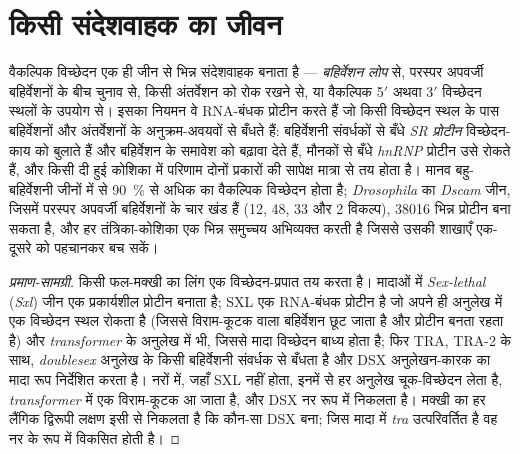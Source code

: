 \section{किसी संदेशवाहक का जीवन}

\begin{definition}[नियमित विच्छेदन]\label{def:b3:rna-regulation:splicing}
वैकल्पिक विच्छेदन एक ही जीन से भिन्न संदेशवाहक बनाता है ---
\emph{बहिर्वेशन लोप} से, परस्पर अपवर्जी बहिर्वेशनों के बीच चुनाव से,
किसी अंतर्वेशन को रोक रखने से, या वैकल्पिक 5$'$ अथवा 3$'$ विच्छेदन
स्थलों के उपयोग से। इसका नियमन वे RNA-बंधक प्रोटीन करते हैं जो किसी
विच्छेदन स्थल के पास बहिर्वेशनों और अंतर्वेशनों के अनुक्रम-अवयवों से
बँधते हैं: बहिर्वेशनी संवर्धकों से बँधे \emph{SR प्रोटीन}
विच्छेदन-काय को बुलाते हैं और बहिर्वेशन के समावेश को बढ़ावा देते हैं,
मौनकों से बँधे \emph{hnRNP} प्रोटीन उसे रोकते हैं, और किसी दी हुई
कोशिका में परिणाम दोनों प्रकारों की सापेक्ष मात्रा से तय होता है। मानव
बहु-बहिर्वेशनी जीनों में से \qty{90}{\%} से अधिक का वैकल्पिक विच्छेदन
होता है; \emph{Drosophila} का \emph{Dscam} जीन, जिसमें परस्पर अपवर्जी
बहिर्वेशनों के चार खंड हैं (12, 48, 33 और 2 विकल्प), \num{38016} भिन्न
प्रोटीन बना सकता है, और हर तंत्रिका-कोशिका एक भिन्न समुच्चय अभिव्यक्त
करती है जिससे उसकी शाखाएँ एक-दूसरे को पहचानकर बच सकें।
\end{definition}

\begin{proof}[प्रमाण-सामग्री]
किसी फल-मक्खी का लिंग एक विच्छेदन-प्रपात तय करता है। मादाओं में
\emph{Sex-lethal} (\emph{Sxl}) जीन एक प्रकार्यशील प्रोटीन बनाता है; SXL
एक RNA-बंधक प्रोटीन है जो अपने ही अनुलेख में एक विच्छेदन स्थल रोकता है
(जिससे विराम-कूटक वाला बहिर्वेशन छूट जाता है और प्रोटीन बनता रहता है)
और \emph{transformer} के अनुलेख में भी, जिससे मादा विच्छेदन बाध्य होता
है; फिर TRA, TRA-2 के साथ, \emph{doublesex} अनुलेख के किसी बहिर्वेशनी
संवर्धक से बँधता है और DSX अनुलेखन-कारक का मादा रूप निर्देशित करता है।
नरों में, जहाँ SXL नहीं होता, इनमें से हर अनुलेख चूक-विच्छेदन लेता है,
\emph{transformer} में एक विराम-कूटक आ जाता है, और DSX नर रूप में
निकलता है। मक्खी का हर लैंगिक द्विरूपी लक्षण इसी से निकलता है कि कौन-सा
DSX बना; जिस मादा में \emph{tra} उत्परिवर्तित है वह नर के रूप में
विकसित होती है।
\end{proof}

